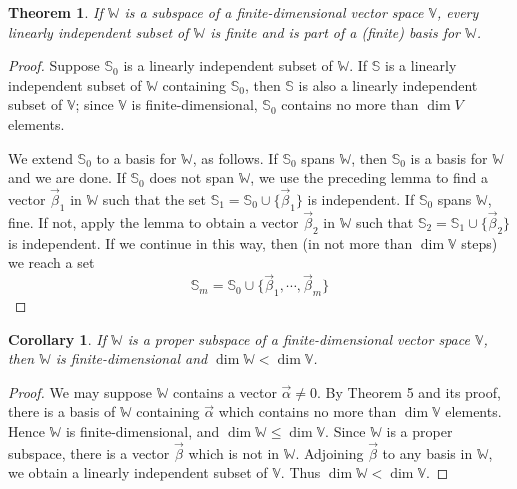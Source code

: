 \documentclass{article}
\newtheorem{theorem}{Theorem}
\newtheorem{corollary}{Corollary}
\begin{document}
    \begin{theorem}
        If \(\mathbb{W}\) is a subspace of a finite-dimensional vector space \(\mathbb{V}\), 
        every linearly independent subset of \(\mathbb{W}\) is finite and is part of a (finite) 
        basis for \(\mathbb{W}\).
    \end{theorem}
    \begin{proof}
        Suppose \(\mathbb{S}_0\) is a linearly independent subset of \(\mathbb{W}\). If 
        \(\mathbb{S}\) is a linearly independent subset of \(\mathbb{W}\) containing \(\mathbb{S}_0\),
        then \(\mathbb{S}\) is also a linearly independent subset of \(\mathbb{V}\); since 
        \(\mathbb{V}\) is finite-dimensional, \(\mathbb{S}_0\) contains no more than \(\dim{V}\) elements.

        We extend \(\mathbb{S}_0\) to a basis for \(\mathbb{W}\), as follows. If \(\mathbb{S}_0\) 
        spans \(\mathbb{W}\), then \(\mathbb{S}_0\) is a basis for \(\mathbb{W}\) and we are done.
        If \(\mathbb{S}_0\) does not span \(\mathbb{W}\), we use the preceding lemma to find a 
        vector \(\vec{\beta}_1\) in \(\mathbb{W}\) such that the set \(\mathbb{S}_1=\mathbb{S}_0 \cup {\{\vec{\beta}_1\}}\) 
        is independent. If \(\mathbb{S}_0\) spans \(\mathbb{W}\), fine. If not, apply the lemma 
        to obtain a vector \(\vec{\beta}_2\) in \(\mathbb{W}\) such that \(\mathbb{S}_2=\mathbb{S}_1 \cup{\{\vec{\beta}_2\}}\)
        is independent. If we continue in this way, then (in not more than \(\dim{\mathbb{V}}\) steps) we reach a set 
        \[\mathbb{S}_m=\mathbb{S}_0 \cup{\{\vec{\beta}_1, \cdots, \vec{\beta}_m\}}\] 
    \end{proof}
    \setcounter{corollary}{0}
    \begin{corollary}
        If \(\mathbb{W}\) is a proper subspace of a finite-dimensional vector space 
        \(\mathbb{V}\), then \(\mathbb{W}\) is finite-dimensional and \(\dim{\mathbb{W}} < \dim{\mathbb{V}}\).
    \end{corollary}
    \begin{proof}
        We may suppose \(\mathbb{W}\) contains a vector \(\vec{\alpha} \neq 0\). By 
        Theorem 5 and its proof, there is a basis of \(\mathbb{W}\) containing \(\vec{\alpha}\)
        which contains no more than \(\dim{\mathbb{V}}\) elements. Hence \(\mathbb{W}\) is 
        finite-dimensional, and \(\dim{\mathbb{W}} \leq \dim{\mathbb{V}}\). Since \(\mathbb{W}\)
        is a proper subspace, there is a vector \(\vec{\beta}\) which is not in \(\mathbb{W}\).
        Adjoining \(\vec{\beta}\) to any basis in \(\mathbb{W}\), we obtain a linearly 
        independent subset of \(\mathbb{V}\). Thus \(\dim{\mathbb{W}} < \dim{\mathbb{V}}\).
    \end{proof}
\end{document}
